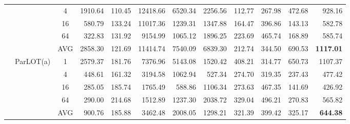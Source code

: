 \begin{table*}[]
\begin{center}
\begin{tabular}{|c|c|c|rrrrrrrr|r|}
 & & 4                                                 & 1910.64 & 110.45 & 12418.66 &  6520.34 &  2256.56 & 112.77 & 267.98 &  472.68 &  928.16  \\
 & & 16                                                &  580.79 & 133.24 & 11017.36 &  1239.31 &  1347.88 & 164.47 & 396.86 &  143.13 &  582.78  \\
 & & 64                                                &  322.83 & 131.92 &  9154.99 &  1065.12 &  1896.25 & 223.69 & 465.74 &  168.89 &  585.74  \\ \cline{3-12} 
 & & AVG                                               & 2858.30 & 121.69 & 11414.74 &  7540.09 &  6839.30 & 212.74 & 344.50 &  690.53 & \textbf{1117.01}  \\ \cline{2-12} 
 & \multirow{5}{*}{ParLOT(a)} & 1 & 2579.37 & 181.76 &  7376.96 &  5143.08 &  1520.42 & 408.21 & 314.77 &  650.73 & 1107.37 \\
 & & 4                            &  448.61 & 161.32 &  3194.58 &  1062.94 &   527.34 & 274.70 & 319.35 &  237.43 &  477.42 \\
 & & 16                           &  285.05 & 185.74 &  1765.49 &   588.86 &  1106.34 & 273.63 & 467.35 &  141.69 &  426.92 \\
 & & 64                           &  290.00 & 214.68 &  1512.89 &  1237.30 &  2038.72 & 329.04 & 496.21 &  270.83 &  565.82 \\ \cline{3-12}
 & & AVG                          &  900.76 & 185.88 &  3462.48 &  2008.05 &  1298.21 & 321.39 & 399.42 &  325.17 &  \textbf{644.38} \\ \cline{2-12} \hline
\end{tabular}
\end{center}
\end{table*}

\fi


